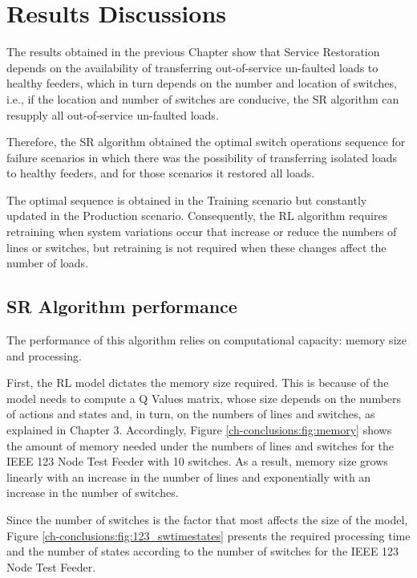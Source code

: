 \section{Results Discussions}

The results obtained in the previous Chapter show that Service Restoration depends on the availability 
of transferring out-of-service un-faulted loads to healthy feeders, which in turn depends on the number 
and location of switches, i.e., if the location and number of switches are conducive, the SR algorithm 
can resupply all out-of-service un-faulted loads. 

Therefore, the SR algorithm obtained the optimal switch operations sequence for failure scenarios in 
which there was the possibility of transferring isolated loads to healthy feeders, and for those 
scenarios it restored all loads. 

The optimal sequence is obtained in the Training scenario but constantly updated in the Production
scenario. Consequently, the RL algorithm requires retraining when system variations occur that increase or 
reduce the numbers of lines or switches, but retraining is not required when these changes affect the 
number of loads. 

\subsection{SR Algorithm performance}
The performance of this algorithm relies on computational capacity: memory size and processing.

First, the RL model dictates the memory size required. This is because of the model needs to compute a Q 
Values matrix, whose size depends on the numbers of actions and states and, in turn, on the numbers of 
lines and switches, as explained in Chapter 3. Accordingly, Figure \ref{ch-conclusions:fig:memory} shows the amount of 
memory needed under the numbers of lines and switches for the IEEE 123 Node Test Feeder with 10 switches.
As a result, memory size grows linearly with an increase in the number of lines and exponentially with 
an increase in the number of switches. 


Since the number of switches is the factor that most affects the size of the model, Figure \ref{ch-conclusions:fig:123_swtimestates} 
presents the required processing time and the number of states according to the number of switches for the IEEE 123 Node Test Feeder.



\newpage 
\newpage
